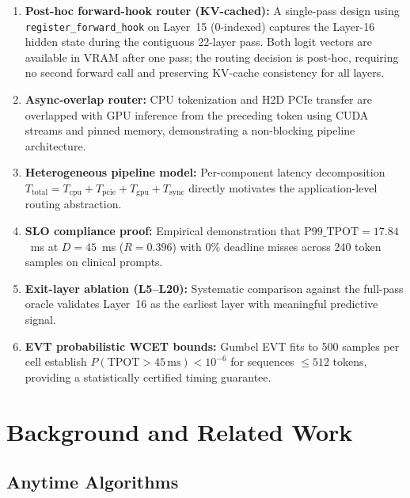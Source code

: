 \documentclass[conference]{IEEEtran}
\begin{document}
\begin{enumerate}[leftmargin=*]
\item \textbf{Post-hoc forward-hook router (KV-cached):}
      A single-pass design using \texttt{register\_forward\_hook} on
      Layer~15 (0-indexed) captures the Layer-16 hidden state during the
      contiguous 22-layer pass. Both logit vectors are available in VRAM
      after one pass; the routing decision is post-hoc, requiring no
      second forward call and preserving KV-cache consistency for all layers.

\item \textbf{Async-overlap router:}
      CPU tokenization and H2D PCIe transfer are overlapped with GPU
      inference from the preceding token using CUDA streams and pinned
      memory, demonstrating a non-blocking pipeline architecture.

\item \textbf{Heterogeneous pipeline model:}
      Per-component latency decomposition $T_{\text{total}} =
      T_{\text{cpu}} + T_{\text{pcie}} + T_{\text{gpu}} + T_{\text{sync}}$
      directly motivates the application-level routing abstraction.

\item \textbf{SLO compliance proof:}
      Empirical demonstration that $\text{P99\_TPOT} = 17.84$~ms
      at $D=45$~ms ($R=0.396$) with 0\% deadline misses across
      240 token samples on clinical prompts.

\item \textbf{Exit-layer ablation (L5--L20):}
      Systematic comparison against the full-pass oracle validates
      Layer~16 as the earliest layer with meaningful predictive signal.

\item \textbf{EVT probabilistic WCET bounds:}
      Gumbel EVT fits to 500 samples per cell establish
      $P(\text{TPOT}>45\,\text{ms})<10^{-6}$ for sequences $\leq 512$
      tokens, providing a statistically certified timing guarantee.
\end{enumerate}

\section{Background and Related Work}

\subsection{Anytime Algorithms}
\end{document}
